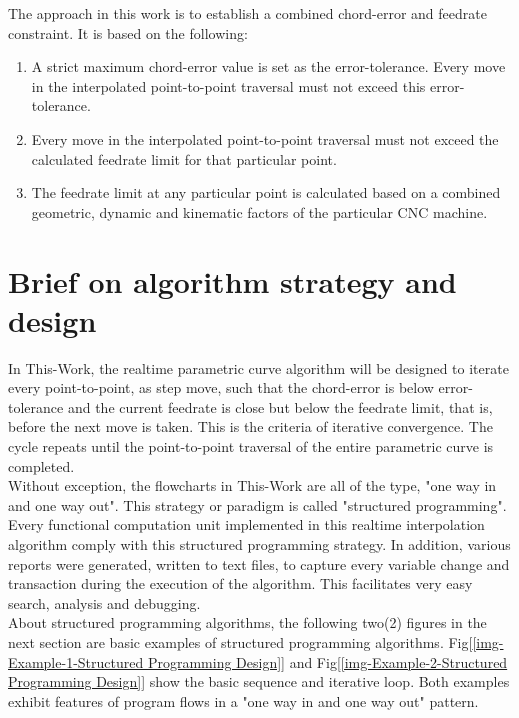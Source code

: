 The approach in this work is to establish a combined chord-error and feedrate constraint. It is based on the following:

\begin{enumerate}
	\item A strict maximum chord-error value is set as the error-tolerance. Every move in the interpolated point-to-point traversal must not exceed this error-tolerance. 
	
	\item Every move in the interpolated point-to-point traversal must not exceed the calculated feedrate limit for that particular point.

    \item The feedrate limit at any particular point is calculated based on a combined geometric, dynamic and kinematic factors of the particular CNC machine. 
	
\end{enumerate}

\section{Brief on algorithm strategy and design}

In This-Work, the realtime parametric curve algorithm will be designed to iterate every point-to-point, as step move, such that the chord-error is below error-tolerance and the current feedrate is close but below the feedrate limit, that is, before the next move is taken. This is the criteria of iterative convergence. The cycle repeats until the point-to-point traversal of the entire parametric curve is completed.\\

Without exception, the flowcharts in This-Work are all of the type, "one way in and one way out". This strategy or paradigm is called "structured programming". Every functional computation unit implemented in this realtime interpolation algorithm comply with this structured programming strategy. In addition, various reports were generated, written to text files,  to capture every variable change and transaction during the execution of the algorithm. This facilitates very easy search, analysis and debugging. \\

About structured programming algorithms, the following two(2) figures in the next section are basic examples of structured programming algorithms. Fig[\ref{img-Example-1-Structured Programming Design}] and Fig[\ref{img-Example-2-Structured Programming Design}] show the basic sequence and iterative loop. Both examples exhibit features of program flows in a "one way in and one way out" pattern. \\

